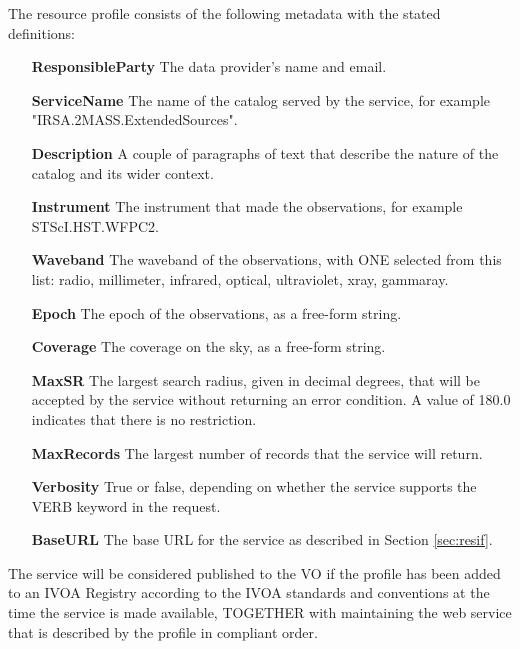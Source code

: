 \documentclass[11pt,a4paper]{ivoa}
\begin{document}
The resource profile consists of the following metadata with the stated definitions:
\begin{itemize}
	\item[\textbf{ResponsibleParty}] The data provider's name and email.
	\item[\textbf{ServiceName}] The name of the catalog served by the service, for example "IRSA.2MASS.ExtendedSources".
	\item[\textbf{Description}] A couple of paragraphs of text that describe the nature of the catalog and its wider context.
	\item[\textbf{Instrument}] The instrument that made the observations, for example STScI.HST.WFPC2.
	\item[\textbf{Waveband}] The waveband of the observations, with ONE selected from this list: radio, millimeter, infrared, optical, ultraviolet, xray, gammaray.
	\item[\textbf{Epoch}] The epoch of the observations, as a free-form string.
	\item[\textbf{Coverage}] The coverage on the sky, as a free-form string.
	\item[\textbf{MaxSR}] The largest search radius, given in decimal degrees, that will be accepted by the service without returning an error condition. A value of 180.0 indicates that there is no restriction.
	\item[\textbf{MaxRecords}] The largest number of records that the service will return.
	\item[\textbf{Verbosity}] True or false, depending on whether the service supports the VERB keyword in the request.
	\item[\textbf{BaseURL}] The base URL for the service as described in Section \ref{sec:resif}.
\end{itemize}
The service will be considered published to the VO if the profile has been added to an IVOA Registry according to the IVOA standards and conventions at the time the service is made available, TOGETHER with maintaining the web service that is described by the profile in compliant order.

\appendix
\end{document}
